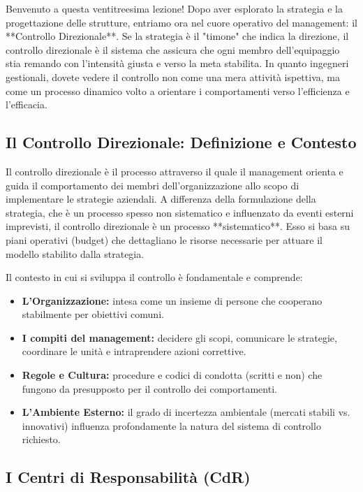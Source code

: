 \documentclass[a4paper,10pt]{article}
\begin{document}
Benvenuto a questa ventitreesima lezione! Dopo aver esplorato la strategia e la progettazione delle strutture, entriamo ora nel cuore operativo del management: il **Controllo Direzionale**. Se la strategia è il "timone" che indica la direzione, il controllo direzionale è il sistema che assicura che ogni membro dell'equipaggio stia remando con l'intensità giusta e verso la meta stabilita. In quanto ingegneri gestionali, dovete vedere il controllo non come una mera attività ispettiva, ma come un processo dinamico volto a orientare i comportamenti verso l'efficienza e l'efficacia.

\subsection*{Il Controllo Direzionale: Definizione e Contesto}

Il controllo direzionale è il processo attraverso il quale il management orienta e guida il comportamento dei membri dell’organizzazione allo scopo di implementare le strategie aziendali. A differenza della formulazione della strategia, che è un processo spesso non sistematico e influenzato da eventi esterni imprevisti, il controllo direzionale è un processo **sistematico**. Esso si basa su piani operativi (budget) che dettagliano le risorse necessarie per attuare il modello stabilito dalla strategia.

Il contesto in cui si sviluppa il controllo è fondamentale e comprende:
\begin{itemize}
    \item \textbf{L'Organizzazione:} intesa come un insieme di persone che cooperano stabilmente per obiettivi comuni.
    \item \textbf{I compiti del management:} decidere gli scopi, comunicare le strategie, coordinare le unità e intraprendere azioni correttive.
    \item \textbf{Regole e Cultura:} procedure e codici di condotta (scritti e non) che fungono da presupposto per il controllo dei comportamenti.
    \item \textbf{L'Ambiente Esterno:} il grado di incertezza ambientale (mercati stabili vs. innovativi) influenza profondamente la natura del sistema di controllo richiesto.
\end{itemize}

\subsection*{I Centri di Responsabilità (CdR)}
\end{document}
